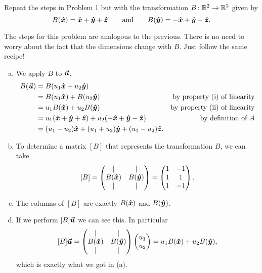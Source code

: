 \documentclass[12pt]{article} %
\begin{document}
\newpage
\begin{problem}
    Repeat the steps in Problem 1 but with the transformation $B \colon \mathbb{R}^2 \to \mathbb{R}^3$ given by
    \[
        B(\boldsymbol{\hat{x}}) = \boldsymbol{\hat{x}} + \boldsymbol{\hat{y}} + \boldsymbol{\hat{z}} \qquad \textrm{and} \qquad B(\boldsymbol{\hat{y}}) = -\boldsymbol{\hat{x}} + \boldsymbol{\hat{y}} - \boldsymbol{\hat{z}}.
    \]
\end{problem}
\begin{solution} The steps for this problem are analogous to the previous. There is no need to worry about the fact that the dimensions change with $B$. Just follow the same recipe!
    \begin{enumerate}[(a)]
        \item We apply $B$ to $\boldsymbol{\boldsymbol{\vec{u}}}$,
        \begin{align*}
            B(\boldsymbol{\boldsymbol{\vec{u}}}) &= B(u_1 \boldsymbol{\hat{x}} + u_2\boldsymbol{\hat{y}})\\
                &= B(u_1\boldsymbol{\hat{x}}) + B(u_2\boldsymbol{\hat{y}}) & \textrm{by property (i) of linearity}\\
                &= u_1 B(\boldsymbol{\hat{x}}) + u_2B(\boldsymbol{\hat{y}}) & \textrm{by property (ii) of linearity}\\
                &= u_1(\boldsymbol{\hat{x}} + \boldsymbol{\hat{y}}+\boldsymbol{\hat{z}}) + u_2(-\boldsymbol{\hat{x}}+\boldsymbol{\hat{y}}-\boldsymbol{\hat{z}}) & \textrm{by definition of $A$}\\
                &= (u_1 - u_2)\boldsymbol{\hat{x}} + (u_1 + u_2)\boldsymbol{\hat{y}} + (u_1 - u_2)\boldsymbol{\hat{z}}.
        \end{align*}
        \item To determine a matrix $[B]$ that represents the transformation $B$, we can take
        \[
            [B] = \begin{pmatrix} \vert & \vert \\ B(\boldsymbol{\hat{x}}) & B(\boldsymbol{\hat{y}}) \\ \vert & \vert \end{pmatrix} = \begin{pmatrix} 1 & -1 \\ 1 & 1 \\ 1 & -1 \end{pmatrix}.
        \]
        \item The columns of $[B]$ are exactly $B(\boldsymbol{\hat{x}})$ and $B(\boldsymbol{\hat{y}})$.
        \item If we perform $[B]\boldsymbol{\boldsymbol{\vec{u}}}$ we can see this. In particular
        \[
            [B]\boldsymbol{\boldsymbol{\vec{u}}} = \begin{pmatrix} \vert & \vert \\ B(\boldsymbol{\hat{x}}) & B(\boldsymbol{\hat{y}}) \\ \vert & \vert \end{pmatrix} \begin{pmatrix} u_1 \\ u_2 \end{pmatrix} = u_1 B(\boldsymbol{\hat{x}}) + u_2 B(\boldsymbol{\hat{y}}),
        \]
        which is exactly what we got in (a).
    \end{enumerate}
\end{solution}
\end{document}

